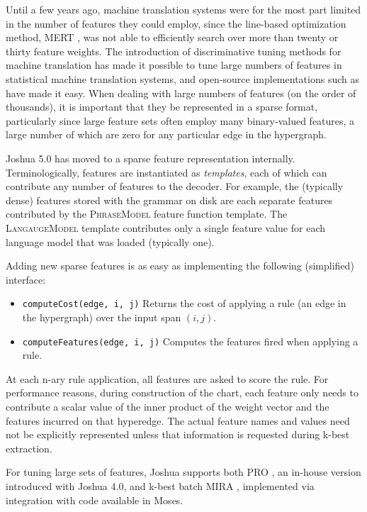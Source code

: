 \documentclass[11pt]{article}
\begin{document}
Until a few years ago, machine translation systems were for the most
part limited in the number of features they could employ, since the
line-based optimization method, MERT \cite{Och2003}, was not able to
efficiently search over more than twenty or thirty feature weights.
The introduction of discriminative tuning methods for machine
translation
\cite{liang2006end,tillmann-zhang:2006:COLACL,chiang2008online,PRO2011}
has made it possible to tune large numbers of features in statistical
machine translation systems, and open-source implementations such as
 have made it easy.  When dealing with large
numbers of features (on the order of thousands), it is important that
they be represented in a sparse format, particularly since large
feature sets often employ many binary-valued features, a large number
of which are zero for any particular edge in the hypergraph.

Joshua 5.0 has moved to a sparse feature representation
internally. Terminologically, features are instantiated as
\emph{templates}, each of which can contribute any number of features
to the decoder. For example, the (typically dense) features stored
with the grammar on disk are each separate features contributed by the
\textsc{PhraseModel} feature function template. The
\textsc{LangaugeModel} template contributes only a single feature
value for each language model that was loaded (typically one).

Adding new sparse features is as easy as implementing the following
(simplified) interface:
%
\begin{itemize}
\item \texttt{computeCost(edge, i, j)} Returns the cost of applying a
  rule (an edge in the hypergraph) over the input span $(i,j)$.
\item \texttt{computeFeatures(edge, i, j)} Computes the features fired
  when applying a rule.
\end{itemize}
%
At each n-ary rule application, all features are asked to score the
rule.  For performance reasons, during construction of the chart, each
feature only needs to contribute a scalar value of the inner product
of the weight vector and the features incurred on that hyperedge. The
actual feature names and values need not be explicitly represented
unless that information is requested during k-best extraction.

For tuning large sets of features, Joshua supports both PRO
\cite{PRO2011}, an in-house version introduced with Joshua 4.0, and
k-best batch MIRA \cite{cherry2012batch}, implemented via integration
with code available in Moses.
\end{document}
